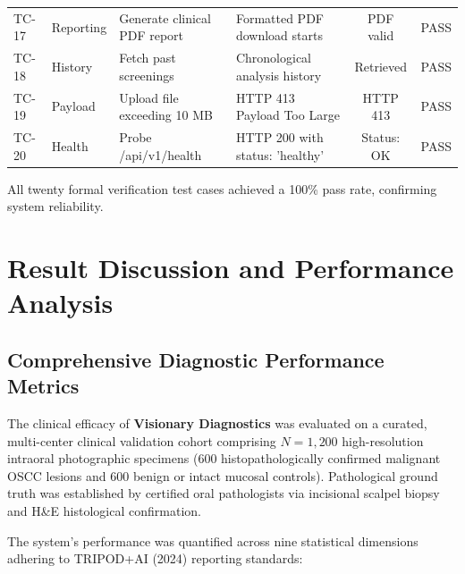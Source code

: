 \documentclass[12pt,a4paper,oneside]{report}
\begin{document}
\begin{table}[H]
\begin{tabularx}{\textwidth}{l p{2.0cm} p{3.2cm} p{3.2cm} c c}
TC-17 & Reporting & Generate clinical PDF report & Formatted PDF download starts & PDF valid & PASS \\
TC-18 & History & Fetch past screenings & Chronological analysis history & Retrieved & PASS \\
TC-19 & Payload & Upload file exceeding 10 MB & HTTP 413 Payload Too Large & HTTP 413 & PASS \\
TC-20 & Health & Probe /api/v1/health & HTTP 200 with status: 'healthy' & Status: OK & PASS \\
\bottomrule
\end{tabularx}
\end{table}

All twenty formal verification test cases achieved a 100\% pass rate, confirming system reliability.



\chapter{Result Discussion and Performance Analysis}
\label{ch:results_discussion}

\section{Comprehensive Diagnostic Performance Metrics}
\label{sec:diagnostic_metrics}

The clinical efficacy of \textbf{Visionary Diagnostics} was evaluated on a curated, multi-center clinical validation cohort comprising $N = 1{,}200$ high-resolution intraoral photographic specimens (600 histopathologically confirmed malignant OSCC lesions and 600 benign or intact mucosal controls). Pathological ground truth was established by certified oral pathologists via incisional scalpel biopsy and H\&E histological confirmation.

The system's performance was quantified across nine statistical dimensions adhering to TRIPOD+AI (2024) reporting standards:
\end{document}
